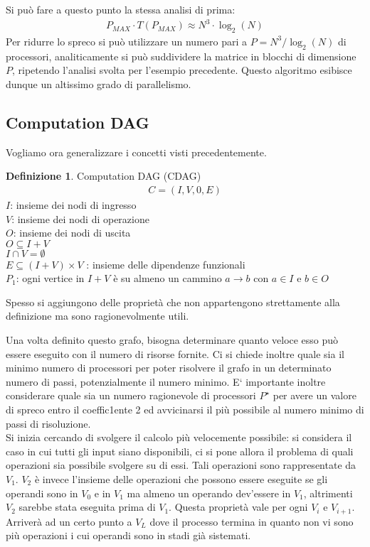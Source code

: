 \documentclass[a4paper,portrait,12pt]{article}
\theoremstyle{definition}
\newtheorem{definition}{Definizione}[section]
\begin{document}
Si può fare a questo punto la stessa analisi di prima:
\begin{align*}
P_{MAX} \cdot T(P_{MAX}) \approx N^3 \cdot \log_2(N)
\end{align*}
Per ridurre lo spreco si può utilizzare un numero pari a $P = N^3 / \log_2(N)$ di processori, analiticamente
si può suddividere la matrice in blocchi di dimensione $P$, ripetendo l’analisi svolta per l’esempio precedente.
Questo algoritmo esibisce dunque un altissimo grado di parallelismo.


\subsection{Computation DAG}

Vogliamo ora generalizzare i concetti visti precedentemente.

\theoremstyle{definition}
\begin{definition}
Computation DAG (CDAG)
\begin{align*}
C = (I, V, 0,E)
\end{align*}
$I$: insieme dei nodi di ingresso\\
$V$: insieme dei nodi di operazione\\
$O$: insieme dei nodi di uscita\\
$O \subseteq I + V$\\
$I \cap V = \emptyset$\\
$E \subseteq (I + V) \times V$ : insieme delle dipendenze funzionali\\
$P_1$: ogni vertice in $I + V$ è su almeno un cammino $a\longrightarrow b$ con $a \in I$ e $b \in O$
\end{definition}
Spesso si aggiungono delle proprietà che non appartengono strettamente alla definizione ma sono ragionevolmente utili.

Una volta definito questo grafo, bisogna determinare quanto veloce esso può essere eseguito con il numero di risorse fornite.
Ci si chiede inoltre quale sia il minimo numero di processori per poter risolvere il grafo in un determinato numero di passi, potenzialmente il numero minimo.
E‘ importante inoltre considerare quale sia un numero ragionevole di processori $P^{\star}$ per avere un valore di spreco entro il coeffic1ente 2 ed avvicinarsi il più possibile al numero minimo di passi di risoluzione.\\

Si inizia cercando di svolgere il calcolo più velocemente possibile: si considera il caso in cui tutti gli input siano disponibili, ci si pone allora il problema di quali operazioni sia possibile svolgere su di essi.
Tali operazioni sono rappresentate da $V_1$. $V_2$ è invece l’insieme delle operazioni che possono essere eseguite se gli operandi sono in $V_0$ e in $V_1$ ma almeno un operando dev’essere in $V_1$, altrimenti $V_2$ sarebbe stata eseguita prima di $V_1$.
Questa proprietà vale per ogni $V_i$ e $V_{i+1}$. 
Arriverà ad un certo punto a $V_L$ dove il processo termina in quanto non vi sono più operazioni i cui operandi sono in stadi già sistemati.\\
\end{document}

